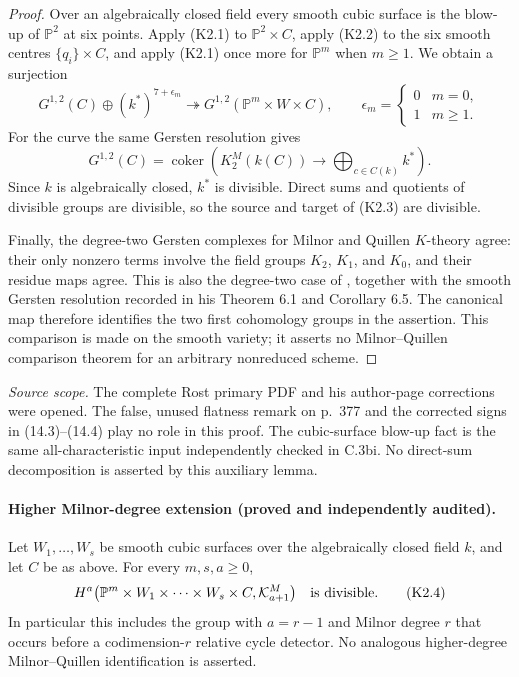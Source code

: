 \begin{proof}
Over an algebraically closed field every smooth cubic surface is the
blow-up of $\mathbb P^2$ at six points. Apply (K2.1) to
$\mathbb P^2\times C$, apply (K2.2) to the six smooth centres
$\{q_i\}\times C$, and apply (K2.1) once more for $\mathbb P^m$
when $m\geq1$. We obtain a surjection
\[
 G^{1,2}(C)\oplus(k^*)^{7+\epsilon_m}
 \twoheadrightarrow G^{1,2}(\mathbb P^m\times W\times C),
 \qquad
 \epsilon_m=\begin{cases}0&m=0,\\1&m\geq1.\end{cases}
 \tag{K2.3}
\]
For the curve the same Gersten resolution gives
\[
 G^{1,2}(C)=\operatorname{coker}\left(
 K^M_2(k(C))\longrightarrow\bigoplus_{c\in C(k)}k^*\right).
\]
Since $k$ is algebraically closed, $k^*$ is divisible. Direct sums and
quotients of divisible groups are divisible, so the source and target
of (K2.3) are divisible.

Finally, the degree-two Gersten complexes for Milnor and Quillen
$K$-theory agree: their only nonzero terms involve the field groups
$K_2$, $K_1$, and $K_0$, and their residue maps agree. This is also
the degree-two case of \citet[Remark 5.4, p.~357]{cyRost1996}, together
with the smooth Gersten resolution recorded in his Theorem 6.1 and
Corollary 6.5. The canonical map therefore identifies the two first
cohomology groups in the assertion. This comparison is made on the
smooth variety; it asserts no Milnor--Quillen comparison theorem for
an arbitrary nonreduced scheme.
\end{proof}

\noindent\emph{Source scope.} The complete Rost primary PDF and his
author-page corrections were opened. The false, unused flatness remark
on p.~377 and the corrected signs in (14.3)--(14.4) play no role in
this proof. The cubic-surface blow-up fact is the same all-characteristic
input independently checked in C.3bi. No direct-sum decomposition is
asserted by this auxiliary lemma.

\paragraph{Higher Milnor-degree extension (proved and independently
audited).}
Let $W_1,\ldots,W_s$ be smooth cubic surfaces over the algebraically
closed field $k$, and let $C$ be as above. For every $m,s,a\geq0$,
\[
 H^a\bigl(\mathbb P^m\times W_1\times\cdots\times W_s\times C,
                 \mathcal K^M_{a+1}\bigr)
 \quad\hbox{is divisible}.
 \tag{K2.4}
\]
In particular this includes the group with $a=r-1$ and Milnor degree
$r$ that occurs before a codimension-$r$ relative cycle detector.
No analogous higher-degree Milnor--Quillen identification is asserted.

